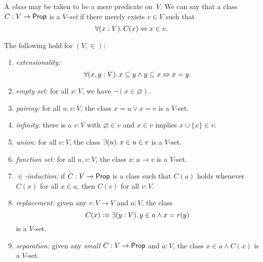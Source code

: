A \emph{class} may be taken to be a mere predicate on~$V$. We can say that a class $C : V \to \mathsf{Prop}$ is a
  \emph{$V$-set} if there merely exists $v\in V$ such that
%
\begin{equation*}
  \fall{x : V} C(x) \Leftrightarrow x \in v.
\end{equation*}


\begin{thm}
  The following hold for $(V, {\in})$:
  \begin{enumerate}
  \item \emph{extensionality:}
    \begin{equation*}
      \fall{x, y : V} x \subseteq y \land y \subseteq x \Leftrightarrow x = y.
    \end{equation*}
     \item \emph{empty set:} for all $x:V$, we have $\neg (x\in \varnothing)$.
    \item \emph{pairing:} for all $u, v:V$, the class $x = u \vee x = v$ is a $V$-set.
    \item \emph{infinity:} there is a $v:V$ with $\varnothing\in v$ and $x\in v$ implies $x\cup \{x\}\in v$.
  \item \emph{union:} for all $v:V$, the class $\exis{u} x \in u \in v$ is a $V$-set.
    \item \emph{function set:} for all $u, v:V$, the class $x : u\to v$ is a $V$-set.
   \item \emph{$\in$-induction:} if $C : V \to \mathsf{Prop}$ is a class such that $C(a)$ holds whenever $C(x)$ for all $x\in a$, then $C(v)$ for all $v:V$.
     \item \emph{replacement:} given any $r : V \to V$ and $a : V$, the class 
  $$C(x) \defeq \exis{y : V} y \in a \land x = r(y)$$ 
  is a $V$-set. 
   \item \emph{separation:} given any \emph{small} $C : V \to \mathsf{Prop}$ and $a : V$, the class $x \in a \land C(x)$ is a $V$-set. 
  \end{enumerate}
\end{thm}


